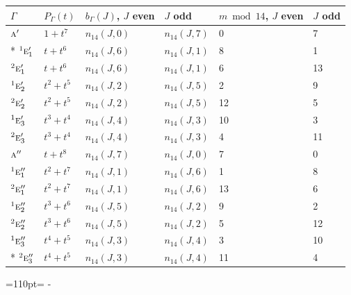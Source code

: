 \documentclass[10pt,a4paper]{article}
\newcommand{\needspace}[1]{\par\penalty-100\begingroup\dimen0=#1\relax\dimen2=\pagegoal
  \advance\dimen2-\pagetotal\ifdim\dimen0>\dimen2\relax\ifdim\dimen2>0pt\vfil\break\fi\fi
  \endgroup}
\numberwithin{equation}{section}
\newcommand{\irr}[1]{\text{\normalfont\scshape #1}}
\newcommand{\conjpair}[1]{{}^{#1}}
\begin{document}
{\small\begin{longtable}{@{}llllll@{}}\toprule
$\Gamma$ & $P_\Gamma(t)$ & $b_\Gamma(J)$, $J$ even & $J$ odd & $m \bmod 14$, $J$ even & $J$ odd\\\midrule\endhead
\bottomrule\endfoot\endlastfoot
$\irr{a}'$ & $1 + t^{7}$ & $n_{14}(J,0)$ & $n_{14}(J,7)$ & 0 & 7\\*
$\conjpair{1}\irr{e}_{1}'$ & $t + t^{6}$ & $n_{14}(J,6)$ & $n_{14}(J,1)$ & 8 & 1\\
$\conjpair{2}\irr{e}_{1}'$ & $t + t^{6}$ & $n_{14}(J,6)$ & $n_{14}(J,1)$ & 6 & 13\\
$\conjpair{1}\irr{e}_{2}'$ & $t^{2} + t^{5}$ & $n_{14}(J,2)$ & $n_{14}(J,5)$ & 2 & 9\\
$\conjpair{2}\irr{e}_{2}'$ & $t^{2} + t^{5}$ & $n_{14}(J,2)$ & $n_{14}(J,5)$ & 12 & 5\\
$\conjpair{1}\irr{e}_{3}'$ & $t^{3} + t^{4}$ & $n_{14}(J,4)$ & $n_{14}(J,3)$ & 10 & 3\\
$\conjpair{2}\irr{e}_{3}'$ & $t^{3} + t^{4}$ & $n_{14}(J,4)$ & $n_{14}(J,3)$ & 4 & 11\\
$\irr{a}''$ & $t + t^{8}$ & $n_{14}(J,7)$ & $n_{14}(J,0)$ & 7 & 0\\
$\conjpair{1}\irr{e}_{1}''$ & $t^{2} + t^{7}$ & $n_{14}(J,1)$ & $n_{14}(J,6)$ & 1 & 8\\
$\conjpair{2}\irr{e}_{1}''$ & $t^{2} + t^{7}$ & $n_{14}(J,1)$ & $n_{14}(J,6)$ & 13 & 6\\
$\conjpair{1}\irr{e}_{2}''$ & $t^{3} + t^{6}$ & $n_{14}(J,5)$ & $n_{14}(J,2)$ & 9 & 2\\
$\conjpair{2}\irr{e}_{2}''$ & $t^{3} + t^{6}$ & $n_{14}(J,5)$ & $n_{14}(J,2)$ & 5 & 12\\
$\conjpair{1}\irr{e}_{3}''$ & $t^{4} + t^{5}$ & $n_{14}(J,3)$ & $n_{14}(J,4)$ & 3 & 10\\*
$\conjpair{2}\irr{e}_{3}''$ & $t^{4} + t^{5}$ & $n_{14}(J,3)$ & $n_{14}(J,4)$ & 11 & 4\\
\bottomrule\end{longtable}}
\needspace{110pt}
\end{document}
